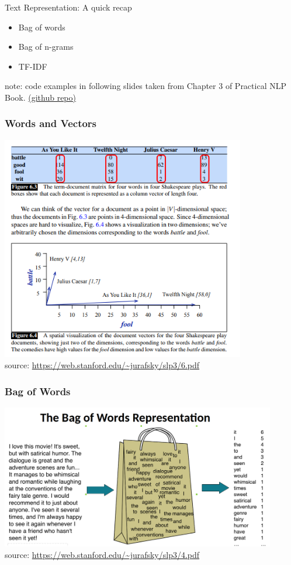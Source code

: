 \documentclass{beamer}
\begin{document}
\begin{frame}{Text Representation: A quick recap}
\begin{itemize}
    \item Bag of words
    \item Bag of n-grams
    \item TF-IDF
\end{itemize}
note: code examples in following slides taken from Chapter 3 of Practical NLP Book. \href{https://github.com/practical-nlp/practical-nlp/tree/master/Ch3}{(github repo)}
\end{frame}

\begin{frame}
\frametitle{Words and Vectors}
\includegraphics[width=0.8\textwidth]{figures/wordsvectors1.PNG}
\\ \tiny source: \url{https://web.stanford.edu/~jurafsky/slp3/6.pdf}
\end{frame}

\begin{frame}
\frametitle{Bag of Words}
\includegraphics[width=0.9\textwidth]{figures/bow.png}
\\ \tiny source: \url{https://web.stanford.edu/~jurafsky/slp3/4.pdf}
\end{frame}
\end{document}
